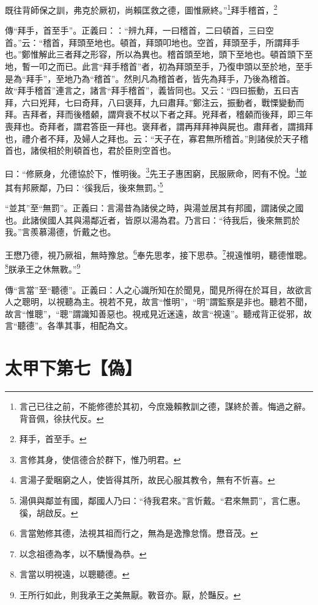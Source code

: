 既往背師保之訓，弗克於厥初，尚賴匡救之德，圖惟厥終。”\footnote{言己已往之前，不能修德於其初，今庶幾賴教訓之德，謀終於善。悔過之辭。背音佩，徐扶代反。}拜手稽首，\footnote{拜手，首至手。}

{\noindent\zhuan{}\fzbyks 傳“拜手，首至手”。正義曰：：“辨九拜，一曰稽首，二曰頓首，三曰空首。”云：“稽首，拜頭至地也。頓首，拜頭叩地也。空首，拜頭至手，所謂拜手也。”鄭惟解此三者拜之形容，所以為異也。稽首頭至地，頭下至地也。頓首頭下至地，暫一叩之而已。此言“拜手稽首”者，初為拜頭至手，乃復申頭以至於地，至手是為“拜手”，至地乃為“稽首”。然則凡為稽首者，皆先為拜手，乃後為稽首。故“拜手稽首”連言之，諸言“拜手稽首”，義皆同也。又云：“四曰振動，五曰吉拜，六曰兇拜，七曰奇拜，八曰褒拜，九曰肅拜。”鄭注云，振動者，戰慄變動而拜。吉拜者，拜而後稽顙，謂齊衰不杖以下者之拜。兇拜者，稽顙而後拜，即三年喪拜也。奇拜者，謂君答臣一拜也。褒拜者，謂再拜拜神與屍也。肅拜者，謂揖拜也，禮介者不拜，及婦人之拜也。云：“天子在，寡君無所稽首。”則諸侯於天子稽首也，諸侯相於則頓首也，君於臣則空首也。 \par}

曰：“修厥身，允德協於下，惟明後。\footnote{言修其身，使信德合於群下，惟乃明君。}先王子惠困窮，民服厥命，罔有不悅。\footnote{言湯子愛睏窮之人，使皆得其所，故民心服其教令，無有不忻喜。}並其有邦厥鄰，乃曰：‘徯我后，後來無罰。’\footnote{湯俱與鄰並有國，鄰國人乃曰：“待我君來。”言忻戴。“君來無罰”，言仁惠。徯，胡啟反。}

{\noindent\shu{}\fzkt “並其”至“無罰”。正義曰：言湯昔為諸侯之時，與湯並居其有邦國，謂諸侯之國也。此諸侯國人其與湯鄰近者，皆原以湯為君。乃言曰：“待我后，後來無罰於我。”言羨慕湯德，忻戴之也。 \par}

王懋乃德，視乃厥祖，無時豫怠。\footnote{言當勉修其德，法視其祖而行之，無為是逸豫怠惰。懋音茂。}奉先思孝，接下思恭。\footnote{以念祖德為孝，以不驕慢為恭。}視遠惟明，聽德惟聰。\footnote{言當以明視遠，以聰聽德。}朕承王之休無斁。”\footnote{王所行如此，則我承王之美無厭。斁音亦。厭，於豔反。}

{\noindent\zhuan{}\fzbyks 傳“言當”至“聽德”。正義曰：人之心識所知在於聞見，聞見所得在於耳目，故欲言人之聰明，以視聽為主。視若不見，故言“惟明”，“明”謂監察是非也。聽若不聞，故言“惟聰”，“聰”謂識知善惡也。視戒見近迷遠，故言“視遠”。聽戒背正從邪，故言“聽德”。各準其事，相配為文。 \par}

\section{太甲下第七【偽】}


